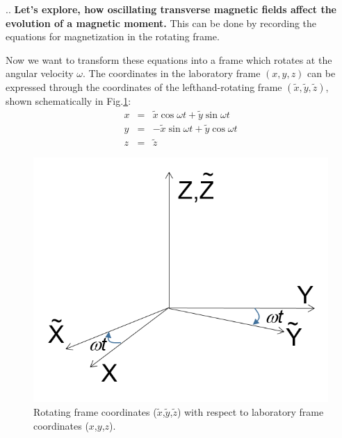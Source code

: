 \documentclass[handout]{beamer}
\begin{document}
\begin{frame}[shrink=5]{\thesection.\thesubsection. \insertsubsection}
  \textbf{ Let's explore, how oscillating transverse magnetic fields affect the evolution of a magnetic moment.}
  This can be done by recording the equations for magnetization in the \alert{rotating frame}.
	
  
  Now we  want to transform these equations into a frame which rotates at the angular velocity $\omega$.  The coordinates in the laboratory frame $(x,y,z)$ can be expressed through the coordinates of the lefthand-rotating frame $(\tilde{x}, \tilde{y}, \tilde{z})$, shown schematically in Fig.\ref{fig:rot_frame}:
 \begin{equation}
 \begin{array}{lcl}
 x &=& \tilde{x} \cos \omega t + \tilde{y} \sin \omega t \\
 y &=& -\tilde{x} \sin \omega t + \tilde{y} \cos \omega t \\
 z &=& \tilde{z}
 \end{array}
 \end{equation}
 
  \begin{figure}[ht] 
  	\caption{Rotating frame coordinates ($\tilde{x}$,$\tilde{y}$,$\tilde{z}$) with respect to laboratory frame coordinates ($x$,$y$,$z$). }
  	\label{fig:rot_frame}
  	\centering
  	\includegraphics[scale=0.3]{figures/rotating_frame.png}
  \end{figure}
\end{frame}
\end{document}
